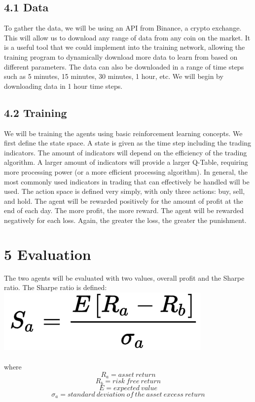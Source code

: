 \documentclass[letterpaper]{article}
\begin{document}
\subsection{4.1 Data}
To gather the data, we will be using an API from Binance, a crypto exchange. This will allow us to download any range of data from any coin on the market. It is a useful tool that we could implement into the training network, allowing the training program to dynamically download more data to learn from based on different parameters. The data can also be downloaded in a range of time steps such as 5 minutes, 15 minutes, 30 minutes, 1 hour, etc. We will begin by downloading data in 1 hour time steps.

\subsection{4.2 Training}
We will be training the agents using basic reinforcement learning concepts. We first define the state space. A state is given as the time step including the trading indicators. The amount of indicators will depend on the efficiency of the trading algorithm. A larger amount of indicators will provide a larger Q-Table, requiring more processing power (or a more efficient processing algorithm). In general, the most commonly used indicators in trading that can effectively be handled will be used. The action space is defined very simply, with only three actions: buy, sell, and hold. The agent will be rewarded positively for the amount of profit at the end of each day. The more profit, the more reward. The agent will be rewarded negatively for each loss. Again, the greater the loss, the greater the punishment.

\section{5 Evaluation}
The two agents will be evaluated with two values, overall profit and the Sharpe ratio. The Sharpe ratio is defined:
\includegraphics{Sharpe} 
\\
\\
where
\[ R_a = asset\ return \] 
\[ R_b = risk\ free\ return \] 
\[ E = expected\  value \] 
\[ \sigma_a = standard\ deviation\ of\ the\ asset\ excess\ return \] 
\end{document}
